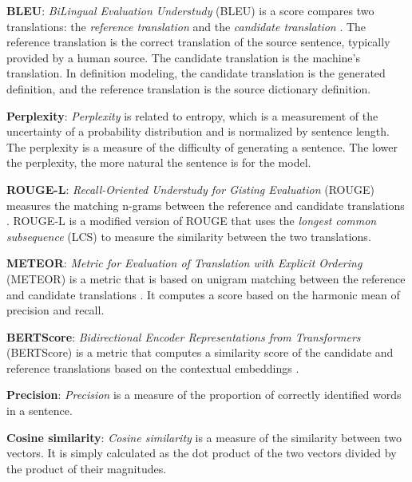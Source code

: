 \textbf{BLEU}: \textit{BiLingual Evaluation Understudy} (BLEU) is a score
compares two translations: the \textit{reference translation} and the
\textit{candidate translation} \cite{papineni_2002_bleu}. The reference
translation is the correct translation of the source sentence, typically
provided by a human source. The candidate translation is the machine's
translation. In definition modeling, the candidate translation is the generated
definition, and the reference translation is the source dictionary definition.

\textbf{Perplexity}: \textit{Perplexity} is related to entropy, which is a
measurement of the uncertainty of a probability distribution and is normalized
by sentence length. The perplexity is a measure of the difficulty of generating
a sentence. The lower the perplexity, the more natural the sentence is for the
model.

\textbf{ROUGE-L}: \textit{Recall-Oriented Understudy for Gisting Evaluation}
(ROUGE) measures the matching n-grams between the reference and candidate
translations \cite{lin_2004_rouge}. ROUGE-L is a modified version of ROUGE that
uses the \textit{longest common subsequence} (LCS) to measure the similarity
between the two translations.

\textbf{METEOR}: \textit{Metric for Evaluation of Translation with Explicit
    Ordering} (METEOR) is a metric that is based on unigram matching between the
reference and candidate translations \cite{banerjee_2005_meteor}. It
computes a score based on the harmonic mean of precision and recall.

\textbf{BERTScore}: \textit{Bidirectional Encoder Representations from
    Transformers} (BERTScore) is a metric that computes a similarity score of
the candidate and reference translations based on the contextual embeddings
\cite{zhang_bertscore_2020}.

\textbf{Precision}: \textit{Precision} is a measure of the proportion of
correctly identified words in a sentence.

\textbf{Cosine similarity}: \textit{Cosine similarity} is a measure of the
similarity between two vectors. It is simply calculated as the dot product of
the two vectors divided by the product of their magnitudes.
